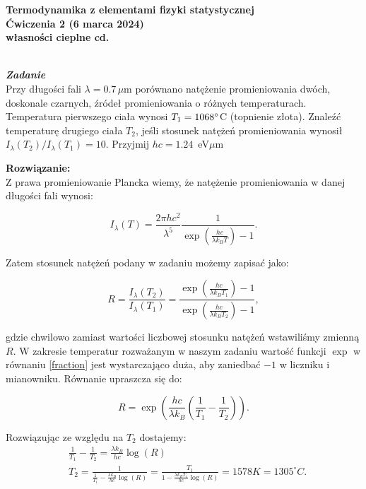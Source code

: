 \documentclass[11pt,a4paper]{article}
\newcounter{zadanie}\newcommand{\zadanie}[1][]{\addtocounter{zadanie}{1} ~\\  {\bf \emph{Zadanie \arabic{zadanie} #1 }} \\}
\begin{document}
\vspace*{-1.8cm}

\begin{centering}
\bf{\Large{Termodynamika z elementami fizyki statystycznej}}\\
Ćwiczenia 2 (6 marca 2024)\\[1mm]
własności cieplne cd. \\
\end{centering}

\zadanie
Przy długości fali $\lambda = 0.7\,\mu$m porównano natężenie promieniowania dwóch,
doskonale czarnych, źródeł promieniowania o różnych temperaturach.
Temperatura pierwszego ciała wynosi $T_1 = 1068 \degree$C (topnienie złota). 
Znaleźć temperaturę drugiego ciała $T_2$, jeśli stosunek natężeń promieniowania 
wynosił $I_\lambda (T_2)/I_\lambda (T_1) = 10$.
Przyjmij $hc = 1.24$~eV$\mu$m

\vskip 10pt
\textbf{Rozwiązanie:}\\
Z prawa promieniowanie Plancka wiemy, że natężenie promieniowania w danej długości fali wynosi:

\begin{equation}
I_\lambda(T) = \frac{2 \pi h c^2}{\lambda^5} \frac{1}{\exp\left(\frac{h c}{\lambda k_B T}\right)-1}.
\label{planck}
\end{equation}

Zatem stosunek natężeń podany w zadaniu możemy zapisać jako:

\begin{equation}
  R=\frac{I_\lambda(T_2)}{I_\lambda(T_1)} =
  \frac{\exp\left(\frac{h c}{\lambda k_B T_1}\right)-1}{\exp\left(\frac{h c}{\lambda k_B T_2}\right)-1},\label{fraction}
\end{equation}

gdzie chwilowo zamiast wartości liczbowej stosunku natężeń wstawiliśmy zmienną $R$. W zakresie temperatur rozważanym w naszym zadaniu wartość funkcji $\exp$ w równaniu \eqref{fraction} jest wystarczająco duża, aby zaniedbać $-1$ w liczniku i mianowniku. Równanie upraszcza się do:

\begin{equation}
R = \exp\left(\frac{h c}{\lambda k_B}\left( \frac{1}{T_1}-\frac{1}{T_2}\right)\right).
\end{equation}

Rozwiązując ze względu na $T_2$ dostajemy:
\begin{align}
&\frac{1}{T_1}-\frac{1}{T_2} = \frac{\lambda k_B}{h c} \log(R)\\
  &T_2 = \frac{1}{\frac{1}{T_1} - \frac{\lambda k_B}{h c} \log(R)} =
  \frac{T_1}{1-\frac{\lambda k_B T_1}{h c} \log(R)} = 1578 K = 1305 ^\circ C.
\end{align}
\end{document}
